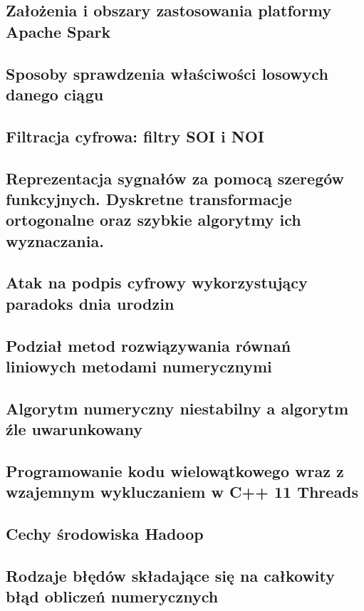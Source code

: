 \documentclass[wi]{zut}
\begin{document}
\subsection{Założenia i obszary zastosowania platformy Apache Spark}

\subsection{Sposoby sprawdzenia właściwości losowych danego ciągu}

\subsection{Filtracja cyfrowa: filtry SOI i NOI}

\subsection{Reprezentacja sygnałów za pomocą szeregów funkcyjnych. Dyskretne transformacje ortogonalne oraz szybkie algorytmy ich wyznaczania.}

\subsection{Atak na podpis cyfrowy wykorzystujący paradoks dnia urodzin}

\subsection{Podział metod rozwiązywania równań liniowych metodami numerycznymi}

\subsection{Algorytm numeryczny niestabilny a algorytm źle uwarunkowany}

\subsection{Programowanie kodu wielowątkowego wraz z wzajemnym wykluczaniem w C++ 11 Threads}

\subsection{Cechy środowiska Hadoop}

\subsection{Rodzaje błędów składające się na całkowity błąd obliczeń numerycznych}
\end{document}

